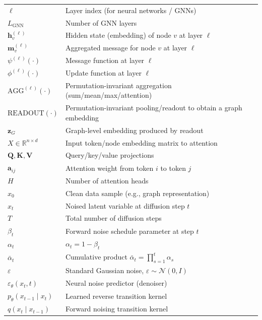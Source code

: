 \begin{tabularx}{\textwidth}{@{}L X@{}}
$\ell$ & Layer index (for neural networks / GNNs) \\
$L_{\mathrm{GNN}}$ & Number of GNN layers \\
$\mathbf{h}_v^{(\ell)}$ & Hidden state (embedding) of node $v$ at layer $\ell$ \\
$\mathbf{m}_v^{(\ell)}$ & Aggregated message for node $v$ at layer $\ell$ \\
$\psi^{(\ell)}(\cdot)$ & Message function at layer $\ell$ \\
$\phi^{(\ell)}(\cdot)$ & Update function at layer $\ell$ \\
$\mathrm{AGG}^{(\ell)}(\cdot)$ & Permutation-invariant aggregation (sum/mean/max/attention) \\
$\mathrm{READOUT}(\cdot)$ & Permutation-invariant pooling/readout to obtain a graph embedding \\
$\mathbf{z}_G$ & Graph-level embedding produced by readout \\

$X\in\mathbb{R}^{n\times d}$ & Input token/node embedding matrix to attention \\
$\mathbf{Q},\mathbf{K},\mathbf{V}$ & Query/key/value projections \\
$\mathbf{a}_{ij}$ & Attention weight from token $i$ to token $j$ \\
$H$ & Number of attention heads \\

$x_0$ & Clean data sample (e.g., graph representation) \\
$x_t$ & Noised latent variable at diffusion step $t$ \\
$T$ & Total number of diffusion steps \\
$\beta_t$ & Forward noise schedule parameter at step $t$ \\
$\alpha_t$ & $\alpha_t=1-\beta_t$ \\
$\bar{\alpha}_t$ & Cumulative product $\bar{\alpha}_t=\prod_{s=1}^t \alpha_s$ \\
$\varepsilon$ & Standard Gaussian noise, $\varepsilon\sim\mathcal{N}(0,I)$ \\
$\varepsilon_\theta(x_t,t)$ & Neural noise predictor (denoiser) \\
$p_\theta(x_{t-1}\mid x_t)$ & Learned reverse transition kernel \\
$q(x_t\mid x_{t-1})$ & Forward noising transition kernel \\


\end{tabularx}

